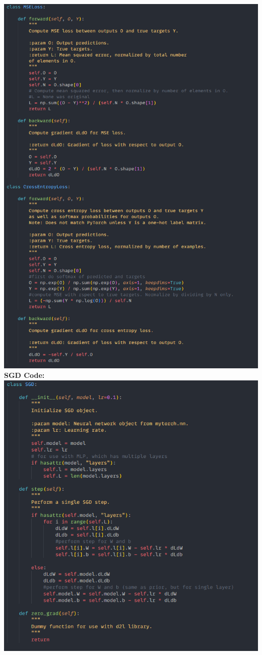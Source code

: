 \documentclass{article}[12pt]
\begin{document}
\includegraphics[width=1\textwidth]{LossCode.png}\\
\textbf{SGD Code:}\\
\includegraphics[width=1\textwidth]{SGDCode.png}\\
\end{document}
